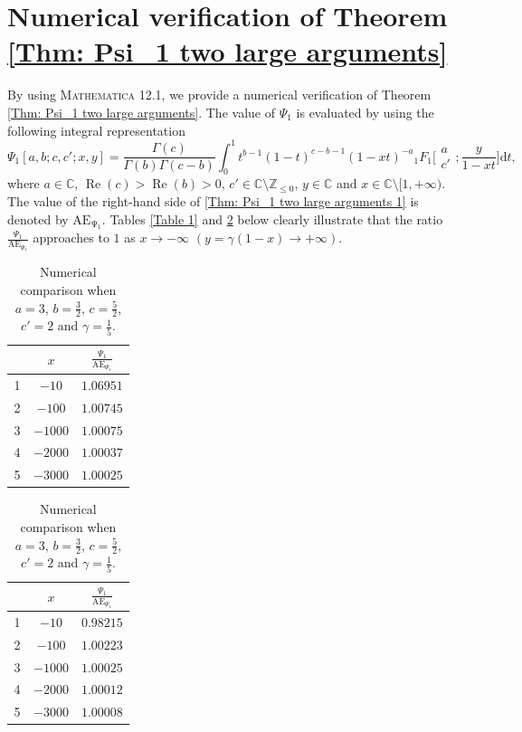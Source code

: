 \documentclass[pdftex]{sigma}
\numberwithin{equation}{section}
\newcommand{\ZZ}{\ensuremath{\mathbb{Z}}}
\begin{document}
\appendix
\section{Numerical verification of Theorem \ref{Thm: Psi_1 two large arguments}}\label{Appendix A}

By using \textsc{Mathematica} 12.1, we provide a numerical verification of Theorem \ref{Thm: Psi_1 two large arguments}. The value of $\Psi_1$ is evaluated by using the following integral representation
	\[
	\Psi_1[a,b;c,c';x,y]
	=\frac{\Gamma(c)}{\Gamma(b)\Gamma(c-b)}\int_{0}^{1}t^{b-1}(1-t)^{c-b-1}(1-xt)^{-a}{}_{1}F_{1}\biggl[\begin{matrix}
		a\\
		c'
	\end{matrix};\frac{y}{1-xt}\biggr]\mathrm{d}t,
	\]
	where $a\in\mathbb{C}$, $\operatorname{Re}(c)>\operatorname{Re}(b)>0$, $c'\in\mathbb{C}\setminus\ZZ_{\leqslant 0}$, $y\in\mathbb{C}$ and $x\in\mathbb{C}\setminus[1,+\infty)$. The value of the right-hand side of \eqref{Thm: Psi_1 two large arguments 1} is denoted by $\mathrm{AE_{\Psi_1}}$. Tables \ref{Table 1} and \ref{Table 2} below clearly illustrate that the ratio $\frac{\Psi_1}{\mathrm{AE}_{\Psi_1}}$ approaches to $1$ as $x\rightarrow-\infty$ $(y=\gamma(1-x)\rightarrow+\infty)$.
\begin{table}[h]
	\renewcommand{\arraystretch}{1.2}
	\centering
	\caption{Numerical comparison when $c'=a=3$, $b=\frac{3}{2}$, $c=\frac{5}{2}$ and $\gamma=1$.}\label{Table 1}
\vspace{1mm}

	\begin{tabular}{|c|cc|}\hline\hline
		~ & $x$ & $\frac{\Psi_1}{\mathrm{AE}_{\Psi_1}}$ \\ \hline\hline
		1 & $-10$ & $1.06951$ \\ \hline
		2 & $-100$ & $1.00745$ \\ \hline
		3 & $-1000$ & $1.00075$ \\ \hline
		4 & $-2000$ & $1.00037$ \\ \hline
		5 & $-3000$ & $1.00025$
		\\ \hline\hline
	\end{tabular}
	\caption{Numerical comparison when $a=3$, $b=\frac{3}{2}$, $c=\frac{5}{2}$, $c'=2$ and $\gamma=\frac{1}{5}$.}\label{Table 2}
\vspace{1mm}

	\begin{tabular}{|c|cc|}\hline\hline
		~ & $x$ & $\frac{\Psi_1}{\mathrm{AE}_{\Psi_1}}$ \\ \hline\hline
		1 & $-10$ & $0.98215$ \\ \hline
		2 & $-100$ & $1.00223$ \\ \hline
		3 & $-1000$ & $1.00025$ \\ \hline
		4 & $-2000$ & $1.00012$ \\ \hline
		5 & $-3000$ & $1.00008$
		\\ \hline\hline
	\end{tabular}
\end{table}
\end{document}
